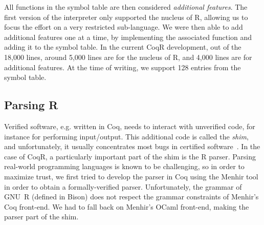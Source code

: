 \documentclass[
    sigplan,
    10pt,
    review, %
    natbib=false %
 ]{acmart}
\newcommand\mb[1]{\todo[color=purple!20,size=\scriptsize]{#1}}
\newcommand\et[1]{\todo[color=blue!20,size=\scriptsize]{#1}}
\newcommand\eti[1]{\todo[color=blue!20,inline]{#1}}
\newcommand\CoqR{CoqR}
\begin{document}
All functions in the symbol table are then considered {\em additional features}. The first version of the interpreter only supported the nucleus of R, allowing us to focus the effort on a very restricted sub-language.
We were then able to add additional features one at a time, by implementing
the associated function and adding it to the symbol table.
In the current \CoqR{} development, out of the 18,000 lines,
around 5,000 lines are for the nucleus of R,
and 4,000 lines are for additional features.
At the time of writing, we support 128 entries from the symbol table.


\subsection{Parsing R}
\label{sec:parsing}

Verified software, e.g. written in Coq, needs to interact with unverified code, for instance for performing input/output. This additional code is called the \emph{shim}, and unfortunately, it usually concentrates most bugs in certified software~\parencite{Yang:2011:FUB:1993498.1993532}.
In the case of \CoqR{}, a particularly important part of the shim is the R parser. Parsing real-world programming languages is known to be challenging, so in order to maximize trust, we first tried to develop the parser in Coq
using the Menhir tool~\parencite{jourdan2012validating} in order to obtain a formally-verified parser. Unfortunately, the grammar of GNU~R (defined in Bison) does not respect the grammar constraints of Menhir's Coq front-end.
We had to fall back on Menhir's OCaml front-end, making the parser part of the shim.
\end{document}
